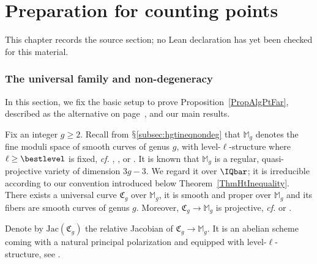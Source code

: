 \chapter{Preparation for counting points}
\label{uniformity-mordell-lang-curves-chapter-06}

\begin{remark}
\label{uniformity-mordell-lang-curves-chapter-06-source}
This chapter records the source section; no Lean declaration has yet been checked for this material.
\notready
\end{remark}

\label{SectionSettingUp}
\subsection{The universal family and non-degeneracy}
\label{subsec:univfamily}
In this section, we fix the basic setup to prove
Proposition~\ref{PropAlgPtFar}, described as the alternative on page~\pageref{eq:alternative}, and
our main results.

Fix an integer $g \ge 2$.
Recall from $\mathsection$\ref{subsec:hgtineqnondeg} that
$\mathbb{M}_g$
denotes the fine moduli space of smooth curves of genus $g$,
with level-$\ell$-structure where $\ell\ge \bestlevel$ is fixed, \textit{cf.}
 \cite[Chapter~XVI, Theorem~2.11 (or above
Proposition~2.8)]{ACG:Curve},
 \cite[(5.14)]{DM:irreducibility}, or \cite[Theorem
 1.8]{OortSteenbrink}. It is known that
$\mathbb{M}_g$ is a regular, quasi-projective variety of dimension
$3g-3$. We regard it over $\IQbar$; it is irreducible according
to our convention introduced below Theorem~\ref{ThmHtInequality}.
There exists a universal curve $\mathfrak{C}_g$ over
$\mathbb{M}_g$,  it is smooth and proper over
$\mathbb{M}_g$ and its fibers are smooth curves of genus
$g$. Moreover, $\mathfrak{C}_g\rightarrow \mathbb{M}_g$ is
projective, \textit{cf.} \cite[Corollary to Theorem
1.2]{DM:irreducibility} or  \cite[Remark 2, \S 9.3]{NeronModels}.

Denote by $\mathrm{Jac}(\mathfrak{C}_g)$ the relative Jacobian of
$\mathfrak{C}_g \rightarrow \mathbb{M}_g$. It is an abelian scheme
coming with a natural principal polarization and equipped with level-$\ell$-structure, see
\cite[Proposition 6.9]{MFK:GIT94}.


